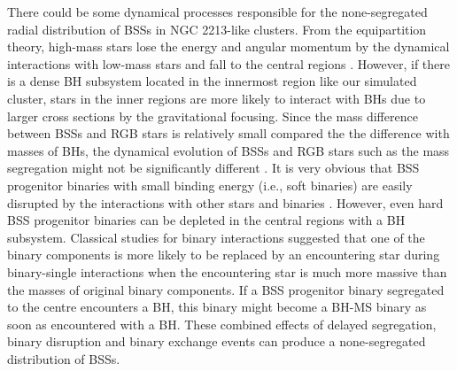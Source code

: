 \documentclass[useAMS,usenatbib,twocolumn]{mnras}
\begin{document}
There could be some dynamical processes responsible for the none-segregated radial distribution of BSSs in NGC 2213-like clusters. From the equipartition theory, high-mass stars lose the energy and angular momentum by the dynamical interactions with low-mass stars and fall to the central regions \citep{2008gady.book.....B}. However, if there is a dense BH subsystem located in the innermost region like our simulated cluster, stars in the inner regions are more likely to interact with BHs due to larger cross sections by the gravitational focusing.
Since the mass difference between BSSs and RGB stars is relatively small compared the the difference with masses of BHs, the dynamical evolution of BSSs and RGB stars such as the mass segregation might not be significantly different \citep[see also][]{2016ApJ...833..252A}. 
It is very obvious that BSS progenitor binaries with small binding energy (i.e., soft binaries) are easily disrupted by the interactions with other stars and binaries \citep{2003gmbp.book.....H}. However, even hard BSS progenitor binaries can be depleted in the central regions with a BH subsystem. Classical studies for binary interactions \citep[e.g.,][]{1996ApJ...467..359H} suggested that one of the binary components is more likely to be replaced by an encountering star during binary-single interactions when the encountering star is much more massive than the masses of original binary components. If a BSS progenitor binary segregated to the centre encounters a BH, this binary might become a BH-MS binary as soon as encountered with a BH. These combined effects of delayed segregation, binary disruption and binary exchange events can produce a none-segregated distribution of BSSs.

\end{document}
